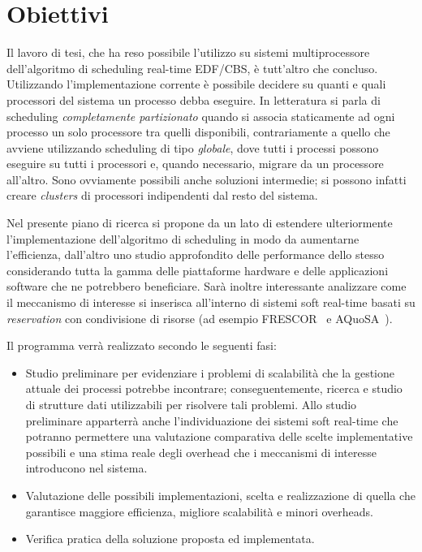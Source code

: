 \documentclass[a4paper, 11pt, oneside]{article}
\begin{document}
\section*{Obiettivi}
Il lavoro di tesi, che ha reso possibile l'utilizzo su sistemi multiprocessore
dell'algoritmo di scheduling real-time EDF/CBS, è tutt'altro che concluso.
Utilizzando l'implementazione corrente è possibile decidere su quanti e quali
processori del sistema un processo debba eseguire. In letteratura si parla di
scheduling \emph{completamente partizionato} quando si associa staticamente ad
ogni processo un solo processore tra quelli disponibili, contrariamente a quello
che avviene utilizzando scheduling di tipo \emph{globale}, dove tutti i processi
possono eseguire su tutti i processori e, quando necessario, migrare da un
processore
all'altro. Sono ovviamente possibili anche soluzioni intermedie; si possono
infatti creare \emph{clusters} di processori indipendenti dal resto del sistema.

Nel presente piano di ricerca si propone da un lato di estendere ulteriormente
l'implementazione dell'algoritmo di scheduling in modo da aumentarne
l'efficienza, dall'altro uno studio approfondito delle performance dello stesso
considerando tutta la gamma delle piattaforme hardware e delle applicazioni
software che ne potrebbero beneficiare. Sarà inoltre interessante analizzare
come il meccanismo di interesse si inserisca all'interno di sistemi soft
real-time basati su \emph{reservation} con condivisione di risorse (ad esempio
FRESCOR~\cite{FRESCOR} e AQuoSA~\cite{AQuoSA}).

Il programma verrà realizzato secondo le seguenti fasi:
\begin{itemize}
\item Studio preliminare per evidenziare i problemi di scalabilità che la
gestione attuale dei processi potrebbe incontrare; conseguentemente, ricerca
e studio di strutture dati utilizzabili per risolvere tali problemi. Allo
studio preliminare apparterrà anche l'individuazione dei sistemi soft
real-time che potranno permettere una valutazione comparativa delle scelte
implementative possibili e una stima reale degli overhead che i meccanismi
di interesse introducono nel sistema.
\item Valutazione delle possibili implementazioni, scelta e realizzazione
di quella che garantisce maggiore efficienza, migliore scalabilità e minori
overheads.
\item Verifica pratica della soluzione proposta ed implementata.
\end{itemize}
\end{document}
